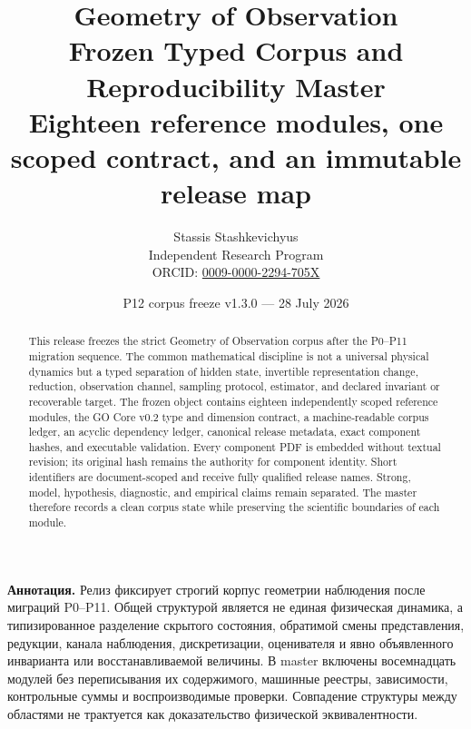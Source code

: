 \documentclass[11pt,a4paper]{article}
\title{\bfseries Geometry of Observation\\
\Large Frozen Typed Corpus and Reproducibility Master\\[0.35em]
\large Eighteen reference modules, one scoped contract, and an immutable release map}
\author{Stassis Stashkevichyus\\
\small Independent Research Program\\
\small ORCID: \href{https://orcid.org/0009-0000-2294-705X}{0009-0000-2294-705X}}
\date{P12 corpus freeze v1.3.0 --- 28 July 2026}
\theoremstyle{definition}
\theoremstyle{plain}
\theoremstyle{remark}
\begin{document}
\maketitle

\begin{center}
\end{center}

\begin{abstract}
This release freezes the strict Geometry of Observation corpus after
the P0--P11 migration sequence.  The common mathematical discipline is
not a universal physical dynamics but a typed separation of hidden
state, invertible representation change, reduction, observation
channel, sampling protocol, estimator, and declared invariant or
recoverable target.  The frozen object contains eighteen independently
scoped reference modules, the GO Core v0.2 type and dimension contract,
a machine-readable corpus ledger, an acyclic dependency ledger,
canonical release metadata, exact component hashes, and executable
validation.  Every component PDF is embedded without textual revision;
its original hash remains the authority for component identity.
Short identifiers are document-scoped and receive fully qualified
release names.  Strong, model, hypothesis, diagnostic, and empirical
claims remain separated.  The master therefore records a clean corpus
state while preserving the scientific boundaries of each module.
\end{abstract}

\begin{sloppypar}
\raggedright
\noindent\textbf{Аннотация.}
Релиз фиксирует строгий корпус геометрии наблюдения после миграций
P0--P11. Общей структурой является не единая физическая динамика, а
типизированное разделение скрытого состояния, обратимой смены
представления, редукции, канала наблюдения, дискретизации, оценивателя и
явно объявленного инварианта или восстанавливаемой величины. В master
включены восемнадцать модулей без переписывания их содержимого,
машинные реестры, зависимости, контрольные суммы и воспроизводимые
проверки. Совпадение структуры между областями не трактуется как
доказательство физической эквивалентности.
\end{sloppypar}
\end{document}
